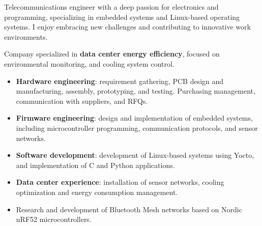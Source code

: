 \documentclass[10pt,a4paper,ragged2e,withhyper]{altacv}
\begin{document}
\begin{paracol}{2}


Telecommunications engineer with a deep passion for electronics and programming, specializing in embedded systems and Linux-based operating systems. I enjoy embracing new challenges and contributing to innovative work environments.

\medskip



Company specialized in \textbf{data center energy efficiency}, focused on environmental monitoring, and cooling system control.

\medskip


\begin{itemize}
    \item \textbf{Hardware engineering}: requirement gathering, PCB design and manufacturing, assembly, prototyping, and testing. Purchasing management, communication with suppliers, and RFQs.
    \item \textbf{Firmware engineering}: design and implementation of embedded systems, including microcontroller programming, communication protocols, and sensor networks.
    \item \textbf{Software development}: development of Linux-based systems using Yocto, and implementation of C and Python applications.
    \item \textbf{Data center experience}: installation of sensor networks, cooling optimization and energy consumption management.
\end{itemize}

\divider

\begin{itemize}
    \item Research and development of Bluetooth Mesh networks based on Nordic nRF52 microcontrollers.
\end{itemize}



\end{paracol}
\end{document}
